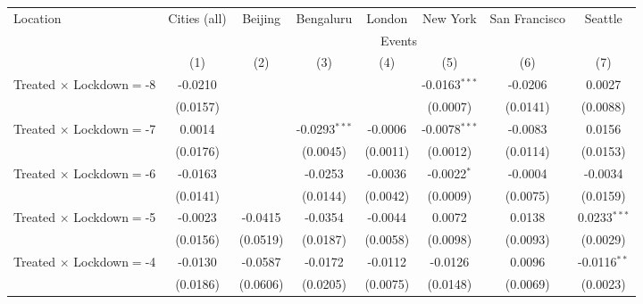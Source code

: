 
\begin{tabular}{lccccccc}
   \toprule
   Location & Cities (all) & Beijing & Bengaluru & London & New York & San Francisco & Seattle \\ \cmidrule(lr){2-2} \cmidrule(lr){3-3} \cmidrule(lr){4-4} \cmidrule(lr){5-5} \cmidrule(lr){6-6} \cmidrule(lr){7-7} \cmidrule(lr){8-8}
    & \multicolumn{7}{c}{Events}\\
                                   & (1)           & (2)           & (3)             & (4)             & (5)                    & (6)           & (7)\\
   \midrule 
   Treated $\times$ Lockdown$=$-8 & -0.0210       &               &                 &                 & -0.0163$^{***}$        & -0.0206       & 0.0027\\
                                   & (0.0157)      &               &                 &                 & (0.0007)               & (0.0141)      & (0.0088)\\
   Treated $\times$ Lockdown$=$-7 & 0.0014        &               & -0.0293$^{***}$ & -0.0006         & -0.0078$^{***}$        & -0.0083       & 0.0156\\
                                   & (0.0176)      &               & (0.0045)        & (0.0011)        & (0.0012)               & (0.0114)      & (0.0153)\\
   Treated $\times$ Lockdown$=$-6 & -0.0163       &               & -0.0253         & -0.0036         & -0.0022$^{*}$          & -0.0004       & -0.0034\\
                                   & (0.0141)      &               & (0.0144)        & (0.0042)        & (0.0009)               & (0.0075)      & (0.0159)\\
   Treated $\times$ Lockdown$=$-5 & -0.0023       & -0.0415       & -0.0354         & -0.0044         & 0.0072                 & 0.0138        & 0.0233$^{***}$\\
                                   & (0.0156)      & (0.0519)      & (0.0187)        & (0.0058)        & (0.0098)               & (0.0093)      & (0.0029)\\
   Treated $\times$ Lockdown$=$-4 & -0.0130       & -0.0587       & -0.0172         & -0.0112         & -0.0126                & 0.0096        & -0.0116$^{**}$\\
                                   & (0.0186)      & (0.0606)      & (0.0205)        & (0.0075)        & (0.0148)               & (0.0069)      & (0.0023)\\

\end{tabular}
